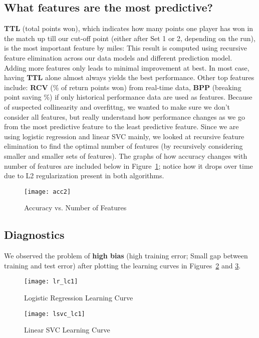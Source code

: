 \documentclass[paper=a4, fontsize=10pt]{scrartcl} %
\numberwithin{equation}{section} %
\numberwithin{figure}{section} %
\numberwithin{table}{section} %
\begin{document}
\subsection{What features are the most predictive?}
\textbf{TTL} (total points won), which indicates how many points one player has won in the match up till our cut-off point (either after Set 1 or 2, depending on the run), is the most important feature by miles: This result is computed using recursive feature elimination across our data models and different prediction model. Adding more features only leads to minimal improvement at best. In most case, having \textbf{TTL} alone almost always yields the best performance. Other top features include: \textbf{RCV} (\% of return points won) from real-time data, \textbf{BPP} (breaking point saving \%) if only historical performance data are used as features. 
Because of suspected collinearity and overfittng, we wanted to make sure we don't consider all features, but really understand how performance changes as we go from the most predictive feature to the least predictive feature. Since we are using logistic regression and linear SVC mainly, we looked at recursive feature elimination to find the optimal number of features (by recursively considering smaller and smaller sets of features). The graphs of how accuracy changes with number of features are included below in Figure~\ref{fig:rfe}; notice how it drops over time due to L2 regularization present in both algorithms. 
\begin{figure}
\caption{Accuracy vs. Number of Features}
  \label{fig:rfe}
  \centering
    \texttt{[image: acc2]}
\end{figure}

\subsection{Diagnostics}
We observed the problem of \textbf{high bias} (high training error; Small gap between training and test error) after plotting the learning curves in Figures~\ref{fig:lr} and \ref{fig:lsvc}. 
\begin{figure}[h]
\caption{Logistic Regression Learning Curve}
  \label{fig:lr}
  \centering
    \texttt{[image: lr\_lc1]}
\end{figure}

\begin{figure}[h]
\caption{Linear SVC Learning Curve}
  \label{fig:lsvc}
  \centering
    \texttt{[image: lsvc\_lc1]}
\end{figure}
\end{document}
